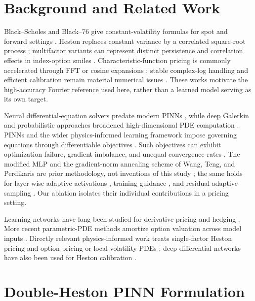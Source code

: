\documentclass[conference]{IEEEtran}
\begin{document}
\section{Background and Related Work}

Black--Scholes and Black--76 give constant-volatility formulas for spot and
forward settings \cite{black1973,black1976}. Heston replaces constant variance
by a correlated square-root process \cite{heston1993}; multifactor variants can
represent distinct persistence and correlation effects in index-option smiles
\cite{cjh2009}. Characteristic-function pricing is commonly accelerated through
FFT or cosine expansions \cite{carr1999,fang2008}; stable complex-log handling
and efficient calibration remain material numerical issues
\cite{lord2010,cui2017}. These works motivate the high-accuracy Fourier
reference used here, rather than a learned model serving as its own target.

Neural differential-equation solvers predate modern PINNs \cite{lagaris1998},
while deep Galerkin and probabilistic approaches broadened high-dimensional PDE
computation \cite{sirignano2018,han2018}. PINNs and the wider physics-informed
learning framework impose governing equations through differentiable objectives
\cite{raissi2019,karniadakis2021,cuomo2022}. Such objectives can exhibit
optimization failure, gradient imbalance, and unequal convergence rates
\cite{wang2021,wang2022,krishnapriyan2021}. The modified MLP and the
gradient-norm annealing scheme of Wang, Teng, and Perdikaris are prior
methodology, not inventions of this study \cite{wang2021}; the same holds for
layer-wise adaptive activations \cite{jagtap2020}, training guidance
\cite{wang2023}, and residual-adaptive sampling \cite{wu2023}. Our ablation
isolates their individual contributions in a pricing setting.

Learning networks have long been studied for derivative pricing and hedging
\cite{hutchinson1994,ruf2020}. More recent parametric-PDE methods amortize
option valuation across model inputs \cite{glau2022}. Directly relevant
physics-informed work treats single-factor Heston pricing and option-pricing or
local-volatility PDEs \cite{hainaut2024,bae2024}; deep differential networks
have also been used for Heston calibration \cite{zhang2025}.

\section{Double-Heston PINN Formulation}
\end{document}
